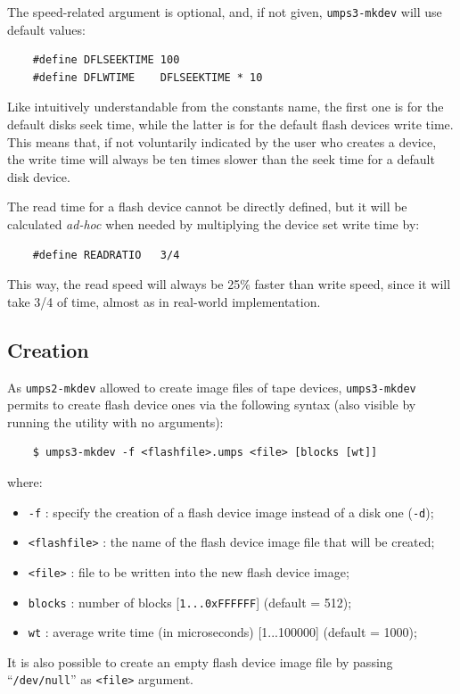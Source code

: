 \documentclass[12pt,a4paper,openright,twoside]{report}
\begin{document}
The speed-related argument is optional, and, if not given, \texttt{umps3-mkdev} will use default values:
\begin{verbatim}
	#define DFLSEEKTIME 100
	#define DFLWTIME    DFLSEEKTIME * 10
	\end{verbatim}
Like intuitively understandable from the constants name, the first one is for the default disks seek time, while the latter is for the default flash devices write time.
This means that, if not voluntarily indicated by the user who creates a device, the write time will always be ten times slower than the seek time for a default disk device.

The read time for a flash device cannot be directly defined, but it will be calculated \textit{ad-hoc} when needed by multiplying the device set write time by:
\begin{verbatim}
	#define READRATIO   3/4
	\end{verbatim}
This way, the read speed will always be 25\% faster than write speed, since it will take 3/4 of time, almost as in real-world implementation.

\subsection{Creation}
As \texttt{umps2-mkdev} allowed to create image files of tape devices, \texttt{umps3-mkdev} permits to create flash device ones via the following syntax (also visible by running the utility with no arguments):
\begin{verbatim}
	$ umps3-mkdev -f <flashfile>.umps <file> [blocks [wt]]
	\end{verbatim}
where:
\begin{itemize}
	\item	\texttt{-f} : specify the creation of a flash device image instead of a disk one (\texttt{-d});
	\item	\texttt{<flashfile>} : the name of the flash device image file that will be created;
	\item	\texttt{<file>} : file to be written into the new flash device image;
	\item	\texttt{blocks} : number of blocks [\texttt{1...0xFFFFFF}] (default = 512);
	\item	\texttt{wt} : average write time (in microseconds) [1...100000] (default = 1000);
\end{itemize}
It is also possible to create an empty flash device image file by passing ``\texttt{/dev/null}'' as \texttt{<file>} argument.
\end{document}
